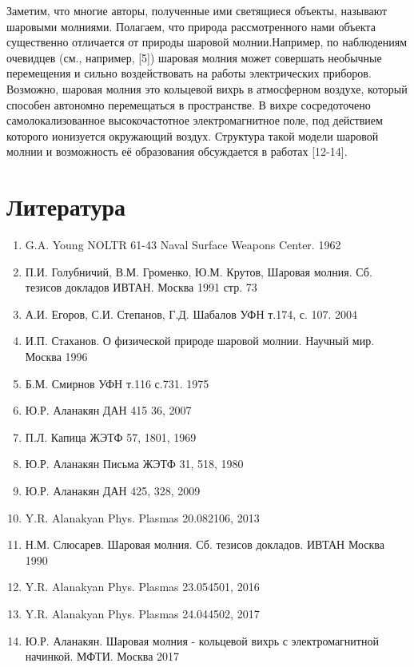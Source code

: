 \documentclass[a4paper]{article}
\begin{document}
Заметим, что многие авторы, полученные ими светящиеся объекты, называют шаровыми молниями. Полагаем, что природа рассмотренного нами объекта существенно отличается от природы шаровой молнии.Например, по наблюдениям очевидцев (см., например, [5]) шаровая молния может совершать необычные перемещения и сильно воздействовать на работы электрических приборов. Возможно, шаровая молния это кольцевой вихрь в атмосферном воздухе, который способен автономно перемещаться в пространстве. В вихре сосредоточено самолокализованное высокочастотное электромагнитное поле, под действием которого ионизуется окружающий воздух. Структура такой модели шаровой молнии и возможность её образования обсуждается в работах [12-14]. 

\newpage
\section{Литература}
\begin{enumerate}
    \item G.A. Young NOLTR 61-43 Naval Surface Weapons Center. 1962
    \item П.И. Голубничий, В.М. Громенко, Ю.М. Крутов, Шаровая молния. Сб. тезисов докладов ИВТАН. Москва 1991 стр. 73
    \item А.И. Егоров, С.И. Степанов, Г.Д. Шабалов УФН т.174, с. 107. 2004
    \item И.П. Стаханов. О физической природе шаровой молнии. Научный мир. Москва 1996
    \item Б.М. Смирнов УФН т.116 с.731. 1975
    \item Ю.Р. Аланакян ДАН 415 36, 2007
    \item П.Л. Капица ЖЭТФ 57, 1801, 1969
    \item Ю.Р. Аланакян Письма ЖЭТФ 31, 518, 1980
    \item Ю.Р. Аланакян ДАН 425, 328, 2009
    \item Y.R. Alanakyan Phys. Plasmas 20.082106, 2013
    \item Н.М. Слюсарев. Шаровая молния. Сб. тезисов докладов. ИВТАН Москва 1990
    \item Y.R. Alanakyan Phys. Plasmas 23.054501, 2016
    \item Y.R. Alanakyan Phys. Plasmas 24.044502, 2017
    \item Ю.Р. Аланакян. Шаровая молния - кольцевой вихрь с электромагнитной начинкой. МФТИ. Москва 2017
    
    
\end{enumerate}

 
\end{document}
